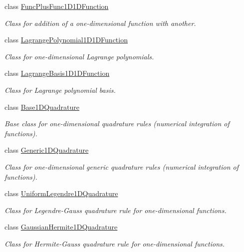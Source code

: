 \begin{DoxyCompactItemize}
class \hyperlink{class_q_u_e_s_o_1_1_func_plus_func1_d1_d_function}{Func\-Plus\-Func1\-D1\-D\-Function}
\begin{DoxyCompactList}\small\item\em Class for addition of a one-\/dimensional function with another. \end{DoxyCompactList}\item 
class \hyperlink{class_q_u_e_s_o_1_1_lagrange_polynomial1_d1_d_function}{Lagrange\-Polynomial1\-D1\-D\-Function}
\begin{DoxyCompactList}\small\item\em Class for one-\/dimensional Lagrange polynomials. \end{DoxyCompactList}\item 
class \hyperlink{class_q_u_e_s_o_1_1_lagrange_basis1_d1_d_function}{Lagrange\-Basis1\-D1\-D\-Function}
\begin{DoxyCompactList}\small\item\em Class for Lagrange polynomial basis. \end{DoxyCompactList}\item 
class \hyperlink{class_q_u_e_s_o_1_1_base1_d_quadrature}{Base1\-D\-Quadrature}
\begin{DoxyCompactList}\small\item\em Base class for one-\/dimensional quadrature rules (numerical integration of functions). \end{DoxyCompactList}\item 
class \hyperlink{class_q_u_e_s_o_1_1_generic1_d_quadrature}{Generic1\-D\-Quadrature}
\begin{DoxyCompactList}\small\item\em Class for one-\/dimensional generic quadrature rules (numerical integration of functions). \end{DoxyCompactList}\item 
class \hyperlink{class_q_u_e_s_o_1_1_uniform_legendre1_d_quadrature}{Uniform\-Legendre1\-D\-Quadrature}
\begin{DoxyCompactList}\small\item\em Class for Legendre-\/\-Gauss quadrature rule for one-\/dimensional functions. \end{DoxyCompactList}\item 
class \hyperlink{class_q_u_e_s_o_1_1_gaussian_hermite1_d_quadrature}{Gaussian\-Hermite1\-D\-Quadrature}
\begin{DoxyCompactList}\small\item\em Class for Hermite-\/\-Gauss quadrature rule for one-\/dimensional functions. \end{DoxyCompactList}\item 

\end{DoxyCompactItemize}
